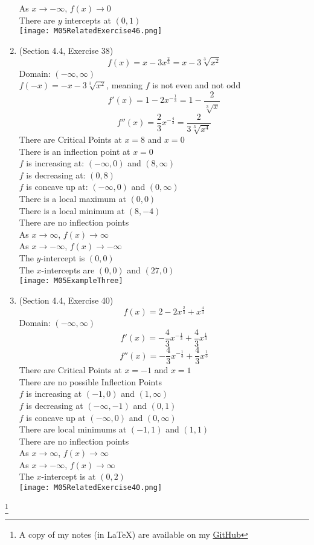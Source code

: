 \documentclass{article}
\newcommand\blfootnote[1]{
    \begingroup
    \renewcommand\thefootnote{}\footnote{#1}
    \addtocounter{footnote}{-1}
    \endgroup
}
\begin{document}
\begin{enumerate}
        As $x \to -\infty$, $f(x) \to 0$ \\
        There are $y$ intercepts at $(0, 1)$ \\
        \texttt{[image: M05RelatedExercise46.png]}
    \item (Section 4.4, Exercise 38)
    $$f(x) = x-3x^{\frac{2}{3}} = x - 3\sqrt[3]{x^2}$$
    Domain: $(-\infty, \infty)$ \\
    $f(-x) = -x - 3\sqrt[3]{x^2}$, meaning $f$ is not even and not odd \\
    $$f'(x) = 1 - 2x^{-\frac{1}{3}} = 1 - \frac{2}{\sqrt[3]{x}}$$
    $$f''(x) = \frac{2}{3}x^{-\frac{4}{3}} = \frac{2}{3\sqrt[3]{x^4}}$$
    There are Critical Points at $x = 8$ and $x = 0$ \\
    There is an inflection point at $x = 0$ \\
    $f$ is increasing at: $(-\infty, 0)$ and $(8, \infty)$ \\
    $f$ is decreasing at: $(0, 8)$ \\
    $f$ is concave up at: $(-\infty, 0)$ and $(0, \infty)$ \\
    There is a local maximum at $(0, 0)$ \\
    There is a local minimum at $(8, -4)$ \\
    There are no inflection points \\
    As $x \to \infty$, $f(x) \to \infty$ \\
    As $x \to -\infty$, $f(x) \to -\infty$ \\
    The $y$-intercept is $(0, 0)$ \\
    The $x$-intercepts are $(0, 0)$ and $(27, 0)$ \\
    \texttt{[image: M05ExampleThree]}
    \item (Section 4.4, Exercise 40)
        $$f(x) = 2 - 2x^{\frac{2}{3}} + x^{\frac{4}{3}}$$
        Domain: $(-\infty, \infty)$ \\
        $$f'(x) = - \frac{4}{3}x^{-\frac{1}{3}} + \frac{4}{3}x^{\frac{1}{3}}$$
        $$f''(x) = - \frac{4}{3}x^{-\frac{1}{3}} + \frac{4}{3}x^{\frac{1}{3}}$$
        There are Critical Points at $x = -1$ and $x = 1$ \\
        There are no possible Inflection Points \\
        $f$ is increasing at $(-1, 0)$ and $(1, \infty)$ \\
        $f$ is decreasing at $(-\infty, -1)$ and $(0, 1)$ \\
        $f$ is concave up at $(-\infty, 0)$ and $(0, \infty)$ \\
        There are local minimums at $(-1, 1)$ and $(1, 1)$ \\
        There are no inflection points \\
        As $x \to \infty$, $f(x) \to \infty$ \\
        As $x \to -\infty$, $f(x) \to \infty$ \\
        The $x$-intercept is at $(0, 2)$ \\
        \texttt{[image: M05RelatedExercise40.png]}
\end{enumerate}

\blfootnote{A copy of my notes (in \LaTeX) are available on my \href{https://github.com/onlinechronically/MATH-211}{GitHub}}
\end{document}
